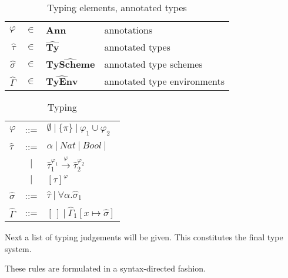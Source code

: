 \documentclass[a4paper]{article}
\begin{document}
\begin{table}
    \begin{centering}
    \begin{tabular}{rcll}
        $\varphi$ &               $\in$ & \textbf{Ann}                   & annotations \\ 
        $\widehat{\tau}$&         $\in$ & $\widehat{\textbf{Ty}      } $ & annotated types \\
        $\widehat{\sigma} $&      $\in$ & $\widehat{\textbf{TyScheme}} $ & annotated type schemes\\
        $\widehat{\Gamma}$&       $\in$ & $\widehat{\textbf{TyEnv}   } $ & annotated type environments  \\
    \end{tabular}
    \caption{Typing elements, annotated types}
    \label{tab:typingelems}
    \end{centering}
\end{table}
\begin{table}
    \begin{centering}
    \begin{tabular}{lcl}
        $ \varphi$         & ::= & $ \emptyset \:|\: \{\pi\} \:|\: \varphi_1 \cup \varphi_2 $ \\
        $\widehat{\tau}$   & ::= & $\alpha \:|\: Nat \: | \: Bool \: | \: $ \\
        & $|$ & $\widehat{\tau}_1^{\varphi_1}
                           \stackrel{\varphi}{\rightarrow} 
                           \widehat{\tau}_2^{\varphi_2} $ \\
                           & $|$ & $ %
                           [\widehat{\tau}]^\varphi   $ \\ 
        $\widehat{\sigma}$ & ::= & $\widehat{\tau} \:|\: \forall \alpha. \widehat{\sigma}_1 $ \\ 
        $\widehat{\Gamma}$ & ::= & $[\,] \:|\: \widehat{\Gamma}_1[x \mapsto \widehat{\sigma}] $ \\
    \end{tabular}
    \caption{Typing}
    \label{tab:typing}
    \end{centering}
\end{table}

Next a list of typing judgements will be given. This constitutes the final type
system. %

These rules are formulated in a syntax-directed fashion. 
\end{document}
